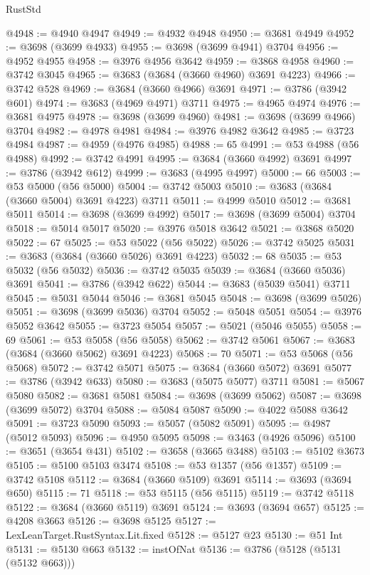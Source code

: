 \begin{lexlean}{RustStd}
\begin{coremodule}
{\begin{coremodule}
{{{{{{{{{{{{{{{{{{{{{{{{{{{{{{{{{{{{{{{{{{{{{{{@4948 := @4940 @4947
@4949 := @4932 @4948
@4950 := @3681 @4949
@4952 := @3698 (@3699 @4933)
@4955 := @3698 (@3699 @4941) @3704
@4956 := @4952 @4955
@4958 := @3976 @4956 @3642
@4959 := @3868 @4958
@4960 := @3742 @3045
@4965 := @3683 (@3684 (@3660 @4960) @3691 @4223)
@4966 := @3742 @528
@4969 := @3684 (@3660 @4966) @3691
@4971 := @3786 (@3942 @601)
@4974 := @3683 (@4969 @4971) @3711
@4975 := @4965 @4974
@4976 := @3681 @4975
@4978 := @3698 (@3699 @4960)
@4981 := @3698 (@3699 @4966) @3704
@4982 := @4978 @4981
@4984 := @3976 @4982 @3642
@4985 := @3723 @4984
@4987 := @4959 (@4976 @4985)
@4988 := 65
@4991 := @53 @4988 (@56 @4988)
@4992 := @3742 @4991
@4995 := @3684 (@3660 @4992) @3691
@4997 := @3786 (@3942 @612)
@4999 := @3683 (@4995 @4997)
@5000 := 66
@5003 := @53 @5000 (@56 @5000)
@5004 := @3742 @5003
@5010 := @3683 (@3684 (@3660 @5004) @3691 @4223) @3711
@5011 := @4999 @5010
@5012 := @3681 @5011
@5014 := @3698 (@3699 @4992)
@5017 := @3698 (@3699 @5004) @3704
@5018 := @5014 @5017
@5020 := @3976 @5018 @3642
@5021 := @3868 @5020
@5022 := 67
@5025 := @53 @5022 (@56 @5022)
@5026 := @3742 @5025
@5031 := @3683 (@3684 (@3660 @5026) @3691 @4223)
@5032 := 68
@5035 := @53 @5032 (@56 @5032)
@5036 := @3742 @5035
@5039 := @3684 (@3660 @5036) @3691
@5041 := @3786 (@3942 @622)
@5044 := @3683 (@5039 @5041) @3711
@5045 := @5031 @5044
@5046 := @3681 @5045
@5048 := @3698 (@3699 @5026)
@5051 := @3698 (@3699 @5036) @3704
@5052 := @5048 @5051
@5054 := @3976 @5052 @3642
@5055 := @3723 @5054
@5057 := @5021 (@5046 @5055)
@5058 := 69
@5061 := @53 @5058 (@56 @5058)
@5062 := @3742 @5061
@5067 := @3683 (@3684 (@3660 @5062) @3691 @4223)
@5068 := 70
@5071 := @53 @5068 (@56 @5068)
@5072 := @3742 @5071
@5075 := @3684 (@3660 @5072) @3691
@5077 := @3786 (@3942 @633)
@5080 := @3683 (@5075 @5077) @3711
@5081 := @5067 @5080
@5082 := @3681 @5081
@5084 := @3698 (@3699 @5062)
@5087 := @3698 (@3699 @5072) @3704
@5088 := @5084 @5087
@5090 := @4022 @5088 @3642
@5091 := @3723 @5090
@5093 := @5057 (@5082 @5091)
@5095 := @4987 (@5012 @5093)
@5096 := @4950 @5095
@5098 := @3463 (@4926 @5096)
@5100 := @3651 (@3654 @431)
@5102 := @3658 (@3665 @3488)
@5103 := @5102 @3673
@5105 := @5100 @5103 @3474
@5108 := @53 @1357 (@56 @1357)
@5109 := @3742 @5108
@5112 := @3684 (@3660 @5109) @3691
@5114 := @3693 (@3694 @650)
@5115 := 71
@5118 := @53 @5115 (@56 @5115)
@5119 := @3742 @5118
@5122 := @3684 (@3660 @5119) @3691
@5124 := @3693 (@3694 @657)
@5125 := @4208 @3663
@5126 := @3698 @5125
@5127 := LexLeanTarget.RustSyntax.Lit.fixed
@5128 := @5127 @23
@5130 := @51 Int
@5131 := @5130 @663
@5132 := instOfNat
@5136 := @3786 (@5128 (@5131 (@5132 @663)))
}}}}}}}}}}}}}}}}}}}}}}}}}}}}}}}}}}}}}}}}}}}}}}}
\end{coremodule}}
\end{coremodule}
\end{lexlean}
